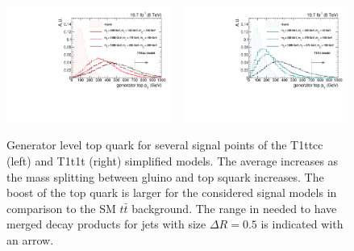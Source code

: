\begin{figure}[htpb]
\centering
\includegraphics[width=0.48\textwidth]{figures/razor_strategy/T1ttcc_gentoppt}
~
\includegraphics[width=0.48\textwidth]{figures/razor_strategy/T1t1t_gentoppt}
\caption{Generator level top quark \pt for several signal points of the T1ttcc (left) and T1t1t
(right) simplified models. The average \pt increases as the mass splitting between gluino
and top squark increases. The boost of
the top quark is larger for the considered signal models in comparison to the SM $t\bar{t}$
background. 
The range in \pt needed to have merged decay products for jets with size $\Delta R = 0.5$ is
indicated with an arrow. 
\label{fig:boost_gen_toppt}}
\end{figure}
